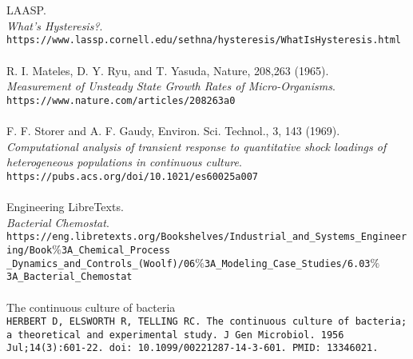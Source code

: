 \documentclass{article}
\begin{document}
\begin{thebibliography}{9}
\\\\
LAASP. 
\\
\textit{What's Hysteresis?}. 
\\\texttt{https://www.lassp.cornell.edu/sethna/hysteresis/WhatIsHysteresis.html}
\\\\
R. I. Mateles, D. Y. Ryu, and T. Yasuda, Nature, 208,263 (1965). 
\\
\textit{Measurement of Unsteady State Growth Rates of Micro-Organisms}. 
\\\texttt{https://www.nature.com/articles/208263a0}
\\\\
F. F. Storer and A. F. Gaudy, Environ. Sci. Technol., 3, 143 (1969). 
\\
\textit{Computational analysis of transient response to quantitative shock loadings of heterogeneous populations in continuous culture}. 
\\\texttt{https://pubs.acs.org/doi/10.1021/es60025a007}
\\\\
Engineering LibreTexts. 
\\
\textit{Bacterial Chemostat}. 
\\\texttt{https://eng.libretexts.org/Bookshelves/Industrial\_and\_Systems\_Engineering/Book$\%$3A\_Chemical\_Process
\\\_Dynamics\_and\_Controls\_(Woolf)/06$\%$3A\_Modeling\_Case\_Studies/6.03$\%$3A\_Bacterial\_Chemostat}
\\\\

The continuous culture of bacteria
\\
\texttt{HERBERT D, ELSWORTH R, TELLING RC. The continuous culture of bacteria; a theoretical and experimental study. J Gen Microbiol. 1956 Jul;14(3):601-22. doi: 10.1099/00221287-14-3-601. PMID: 13346021.}

\end{thebibliography} 
\end{document}
